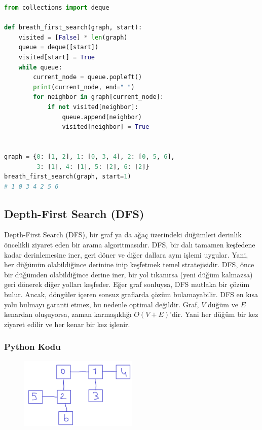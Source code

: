 \begin{lstlisting}[language=Python]
from collections import deque

def breath_first_search(graph, start):
    visited = [False] * len(graph)
    queue = deque([start])
    visited[start] = True
    while queue:
        current_node = queue.popleft()
        print(current_node, end=" ")
        for neighbor in graph[current_node]:
            if not visited[neighbor]:
                queue.append(neighbor)
                visited[neighbor] = True


graph = {0: [1, 2], 1: [0, 3, 4], 2: [0, 5, 6],
         3: [1], 4: [1], 5: [2], 6: [2]}
breath_first_search(graph, start=1)
# 1 0 3 4 2 5 6 
\end{lstlisting}

\newpage

\subsection{Depth-First Search (DFS)}

Depth-First Search (DFS), bir graf ya da ağaç üzerindeki düğümleri derinlik öncelikli ziyaret eden bir arama algoritmasıdır. DFS, bir dalı tamamen keşfedene kadar derinlemesine iner, geri döner ve diğer dallara aynı işlemi uygular. Yani, her düğümün olabildiğince derinine inip keşfetmek temel stratejisidir. DFS, önce bir düğümden olabildiğince derine iner, bir yol tıkanırsa (yeni düğüm kalmazsa) geri dönerek diğer yolları keşfeder. Eğer graf sonluysa, DFS mutlaka bir çözüm bulur. Ancak, döngüler içeren sonsuz graflarda çözüm bulamayabilir. DFS en kısa yolu bulmayı garanti etmez, bu nedenle optimal değildir. Graf, $V$ düğüm ve $E$ kenardan oluşuyorsa, zaman karmaşıklığı $O(V + E)$'dir. Yani her düğüm bir kez ziyaret edilir ve her kenar bir kez işlenir.

\subsubsection{Python Kodu}

\begin{figure}[h]
    \centering
    \includegraphics[width=0.5\textwidth]{images/dfs.png}
    \caption{}
\end{figure}

